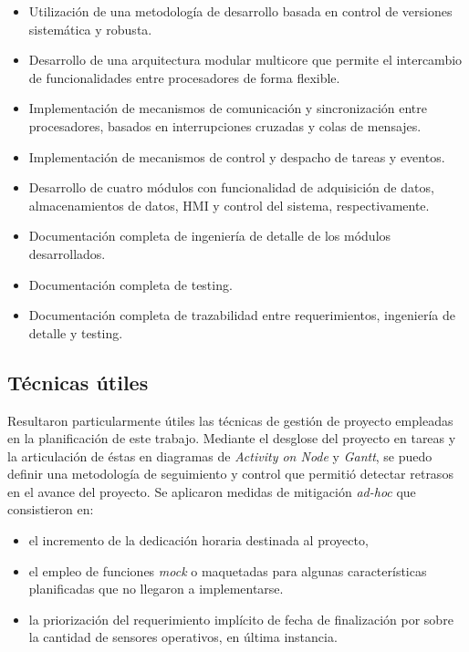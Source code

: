 \begin{itemize}
	\item Utilización de una metodología de desarrollo basada en control de versiones sistemática y robusta.
	\item Desarrollo de una arquitectura modular multicore que permite el intercambio de funcionalidades entre procesadores de forma flexible.
	\item Implementación de mecanismos de comunicación y sincronización entre procesadores, basados en interrupciones cruzadas y colas de mensajes.
	\item Implementación de mecanismos de control y despacho de tareas y eventos.
	\item Desarrollo de cuatro módulos con funcionalidad de adquisición de datos, almacenamientos de datos, HMI y control del sistema, respectivamente. 
	\item Documentación completa de ingeniería de detalle de los módulos desarrollados.
	\item Documentación completa de testing.
	\item Documentación completa de trazabilidad entre requerimientos, ingeniería de detalle y testing.
\end{itemize} 

\subsection{Técnicas útiles}
\label{subsec:tecnicas_utiles}

Resultaron particularmente útiles las técnicas de gestión de proyecto empleadas en la planificación de este trabajo.  Mediante el desglose del proyecto en tareas y la articulación de éstas en diagramas de \textit{Activity on Node} y \textit{Gantt}, se puedo definir una metodología de seguimiento y control que permitió detectar retrasos en el avance del proyecto. Se aplicaron medidas de mitigación \textit{ad-hoc} que consistieron en:

\begin{itemize}
	\item el incremento de la dedicación horaria destinada al proyecto,
	\item el empleo de funciones \textit{mock} o maquetadas para algunas características planificadas que no llegaron a implementarse.
	\item la priorización del requerimiento implícito de fecha de finalización por sobre la cantidad de sensores operativos, en última instancia.
\end{itemize}  

